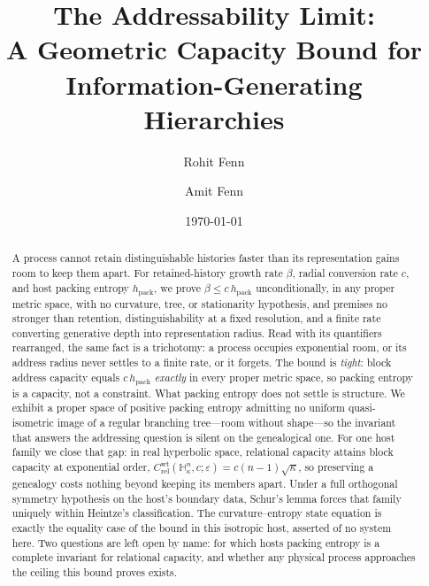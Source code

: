 \documentclass[11pt,reqno]{amsart}
\theoremstyle{plain}
\theoremstyle{definition}
\newcommand{\hpack}{h_{\mathrm{pack}}}
\newcommand{\Crel}{C_{\mathrm{rel}}}
\newcommand{\Hk}{\mathbb{H}^n_\kappa}
\newcommand{\eps}{\varepsilon}
\begin{document}
\title[The Addressability Limit]{The Addressability Limit:\\ A Geometric Capacity Bound for Information-Generating Hierarchies}

\author{Rohit Fenn}
\author{Amit Fenn}
\address{Sentry Bio, Inc., USA}

\date{\today}

\begin{abstract}
A process cannot retain distinguishable histories faster than its representation gains room to keep them apart. For retained-history growth rate $\beta$, radial conversion rate $c$, and host packing entropy $\hpack$, we prove $\beta \le c\,\hpack$ unconditionally, in any proper metric space, with no curvature, tree, or stationarity hypothesis, and premises no stronger than retention, distinguishability at a fixed resolution, and a finite rate converting generative depth into representation radius. Read with its quantifiers rearranged, the same fact is a trichotomy: a process occupies exponential room, or its address radius never settles to a finite rate, or it forgets. The bound is \emph{tight}: block address capacity equals $c\,\hpack$ \emph{exactly} in every proper metric space, so packing entropy is a capacity, not a constraint. What packing entropy does not settle is structure. We exhibit a proper space of positive packing entropy admitting no uniform quasi-isometric image of a regular branching tree---room without shape---so the invariant that answers the addressing question is silent on the genealogical one. For one host family we close that gap: in real hyperbolic space, relational capacity attains block capacity at exponential order, $\Crel^{\mathrm{wt}}(\Hk,c;\eps)=c(n-1)\sqrt\kappa$, so preserving a genealogy costs nothing beyond keeping its members apart. Under a full orthogonal symmetry hypothesis on the host's boundary data, Schur's lemma forces that family uniquely within Heintze's classification. The curvature--entropy state equation is exactly the equality case of the bound in this isotropic host, asserted of no system here. Two questions are left open by name: for which hosts packing entropy is a complete invariant for relational capacity, and whether any physical process approaches the ceiling this bound proves exists.
\end{abstract}
\end{document}

